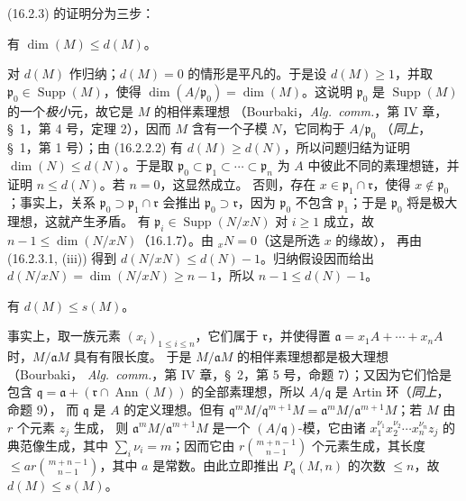 (16.2.3) 的证明分为三步：

\begin{env}[16.2.3.2]
\label{0.16.2.3.2-fr}
有 $\dim(M)\leq d(M)$。
\end{env}

对 $d(M)$ 作归纳；$d(M)=0$ 的情形是平凡的。于是设
$d(M)\geq1$，并取 $\mathfrak{p}_0\in\operatorname{Supp}(M)$，使得
$\dim(A/\mathfrak{p}_0)=\dim(M)$。这说明 $\mathfrak{p}_0$ 是
$\operatorname{Supp}(M)$ 的一个\emph{极小}元，故它是 $M$ 的相伴素理想
（Bourbaki，\emph{Alg.~comm.}，第 IV 章，\S~1，第 4 号，定理 2），因而
$M$ 含有一个子模 $N$，它同构于 $A/\mathfrak{p}_0$
（\emph{同上}，\S~1，第 1 号）；由 (16.2.2.2) 有
$d(M)\geq d(N)$，所以问题归结为证明 $\dim(N)\leq d(N)$。于是取
$\mathfrak{p}_0\subset\mathfrak{p}_1\subset\cdots\subset\mathfrak{p}_n$
为 $A$ 中彼此不同的素理想链，并证明 $n\leq d(N)$。若 $n=0$，这显然成立。
否则，存在 $x\in\mathfrak{p}_1\cap\mathfrak{r}$，使得
$x\notin\mathfrak{p}_0$；事实上，关系
$\mathfrak{p}_0\supset\mathfrak{p}_1\cap\mathfrak{r}$ 会推出
$\mathfrak{p}_0\supset\mathfrak{r}$，因为 $\mathfrak{p}_0$ 不包含
$\mathfrak{p}_1$；于是 $\mathfrak{p}_0$ 将是极大理想，这就产生矛盾。
有 $\mathfrak{p}_i\in\operatorname{Supp}(N/xN)$ 对 $i\geq1$ 成立，故
$n-1\leq\dim(N/xN)$（16.1.7）。由 ${}_xN=0$（这是所选 $x$ 的缘故），
再由 (16.2.3.1, (iii)) 得到 $d(N/xN)\leq d(N)-1$。归纳假设因而给出
$d(N/xN)=\dim(N/xN)\geq n-1$，所以 $n-1\leq d(N)-1$。

\begin{env}[16.2.3.3]
\label{0.16.2.3.3-fr}
有 $d(M)\leq s(M)$。
\end{env}

事实上，取一族元素 $(x_i)_{1\leq i\leq n}$，它们属于
$\mathfrak{r}$，并使得置
$\mathfrak{a}=x_1A+\cdots+x_nA$ 时，$M/\mathfrak{a}M$ 具有有限长度。
于是 $M/\mathfrak{a}M$ 的相伴素理想都是极大理想（Bourbaki，
\emph{Alg.~comm.}，第 IV 章，\S~2，第 5 号，命题 7）；又因为它们恰是
包含 $\mathfrak{q}=\mathfrak{a}+(\mathfrak{r}\cap\operatorname{Ann}(M))$
的全部素理想，所以 $A/\mathfrak{q}$ 是 Artin 环（\emph{同上}，命题 9），
而 $\mathfrak{q}$ 是 $A$ 的定义理想。但有
$\mathfrak{q}^mM/\mathfrak{q}^{m+1}M=
\mathfrak{a}^mM/\mathfrak{a}^{m+1}M$；若 $M$ 由 $r$ 个元素 $z_j$ 生成，
则 $\mathfrak{a}^mM/\mathfrak{a}^{m+1}M$ 是一个
$(A/\mathfrak{q})$-模，它由诸
$x_1^{\nu_1}x_2^{\nu_2}\cdots x_n^{\nu_n}z_j$ 的典范像生成，其中
$\sum_i\nu_i=m$；因而它由 $r\binom{m+n-1}{n-1}$ 个元素生成，其长度
$\leq ar\binom{m+n-1}{n-1}$，其中 $a$ 是常数。由此立即推出
$P_{\mathfrak{q}}(M,n)$ 的次数 $\leq n$，故 $d(M)\leq s(M)$。

